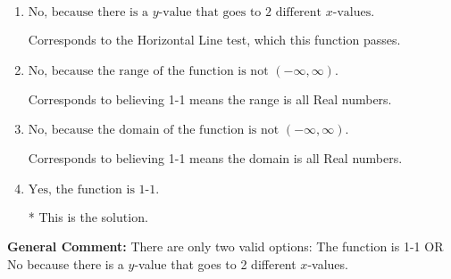\documentclass{extbook}[14pt]
\begin{document}
\begin{enumerate}
{\begin{enumerate}[label=\Alph*.]
Corresponds to the Vertical Line test, which checks if an expression is a function.
\item \( \text{No, because there is a $y$-value that goes to 2 different $x$-values.} \)

Corresponds to the Horizontal Line test, which this function passes.
\item \( \text{No, because the range of the function is not $(-\infty, \infty)$.} \)

Corresponds to believing 1-1 means the range is all Real numbers.
\item \( \text{No, because the domain of the function is not $(-\infty, \infty)$.} \)

Corresponds to believing 1-1 means the domain is all Real numbers.
\item \( \text{Yes, the function is 1-1.} \)

* This is the solution.
\end{enumerate}

\textbf{General Comment:} There are only two valid options: The function is 1-1 OR No because there is a $y$-value that goes to 2 different $x$-values.
}
\end{enumerate}
\end{document}
